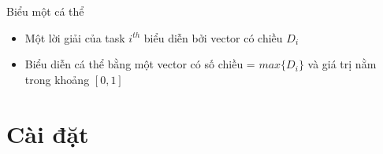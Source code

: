 \documentclass[compress]{beamer}
\begin{document}
\begin{frame}{Biểu một cá thể}
\begin{itemize}
\item Một lời giải của task $i^{th}$ biểu diễn bởi vector có chiều $D_i$
\item Biểu diễn cá thể bằng một vector có số chiều = $max\{D_i\}$ và giá trị nằm trong khoảng $[0,1]$
\end{itemize}
\end{frame}


\section{Cài đặt}
\end{document}
